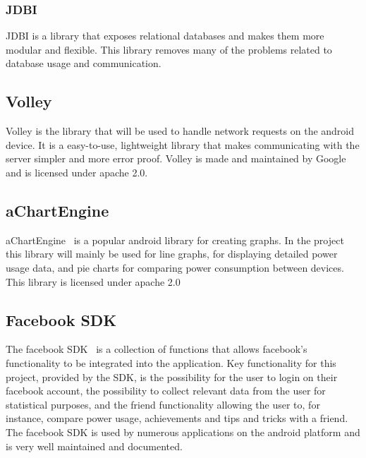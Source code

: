 \subsubsection{JDBI}
JDBI is a library that exposes relational databases and makes them more modular and flexible. This library removes many of the problems related to database usage and communication.

\subsection{Volley}
Volley is the library that will be used to handle network requests on the android device. It is a easy-to-use, lightweight library that makes communicating with the server simpler and more error proof.  Volley is made and maintained by Google and is licensed under apache 2.0.

\subsection{aChartEngine}
aChartEngine~\cite{achart} is a popular android library for creating graphs. In the project this library will mainly be used for line graphs, for displaying detailed power usage data, and pie charts for comparing power consumption between devices. This library is licensed under apache 2.0

\subsection{Facebook SDK}
The facebook SDK~\cite{fsdk} is a collection of functions that allows facebook’s functionality to be integrated into the application. Key functionality for this project, provided by the SDK, is the possibility for the user to login on their facebook account, the possibility to collect relevant data from the user for statistical purposes, and the friend functionality allowing the user to, for instance, compare power usage, achievements and tips and tricks with a friend. The facebook SDK is used by numerous applications on the android platform and is very well maintained and documented. 

